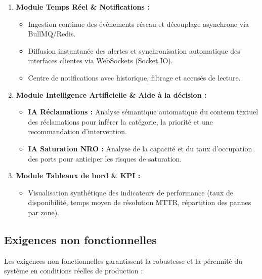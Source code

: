\begin{enumerate}
    \item \textbf{Module Temps R\'eel \& Notifications :}
    \begin{itemize}
        \item Ingestion continue des \'ev\'enements r\'eseau et d\'ecouplage asynchrone via BullMQ/Redis.
        \item Diffusion instantan\'ee des alertes et synchronisation automatique des interfaces clientes via WebSockets (Socket.IO).
        \item Centre de notifications avec historique, filtrage et accus\'es de lecture.
    \end{itemize}

    \item \textbf{Module Intelligence Artificielle \& Aide \`a la d\'ecision :}
    \begin{itemize}
        \item \textbf{IA R\'eclamations :} Analyse s\'emantique automatique du contenu textuel des r\'eclamations pour inf\'erer la cat\'egorie, la priorit\'e et une recommandation d'intervention.
        \item \textbf{IA Saturation NRO :} Analyse de la capacit\'e et du taux d'occupation des ports pour anticiper les risques de saturation.
    \end{itemize}

    \item \textbf{Module Tableaux de bord \& KPI :}
    \begin{itemize}
        \item Visualisation synth\'etique des indicateurs de performance (taux de disponibilit\'e, temps moyen de r\'esolution MTTR, r\'epartition des pannes par zone).
    \end{itemize}
\end{enumerate}

\subsection{Exigences non fonctionnelles}
Les exigences non fonctionnelles garantissent la robustesse et la p\'erennit\'e du syst\`eme en conditions r\'eelles de production :

